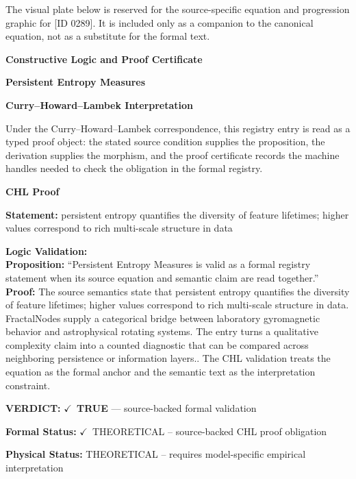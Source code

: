 \begingroup\footnotesize\sloppy
The visual plate below is reserved for the source-specific equation and progression graphic for [ID 0289]. It is included only as a companion to the canonical equation, not as a substitute for the formal text.
\par\endgroup
\ifTZPDarkEdition
{}
\fi

\clearpage
\begingroup\tzpsupportsetup
\noindent\textbf{\fontsize{10.8pt}{12.8pt}\selectfont [ID 0289] Constructive Logic and Proof Certificate}\par
\noindent\textbf{\fontsize{10pt}{12pt}\selectfont Persistent Entropy Measures}\par
\vspace{0.45em}
\begingroup
\footnotesize
\setlength{\parskip}{0.22em}
\setlength{\parindent}{0pt}
\noindent\textbf{Curry--Howard--Lambek Interpretation}\par
Under the Curry--Howard--Lambek correspondence, this registry entry is read as a typed proof
object: the stated source condition supplies the proposition, the derivation supplies the
morphism, and the proof certificate records the machine handles needed to check the obligation
in the formal registry.

\vspace{0.45em}
\noindent\textbf{CHL Proof}\par
\textbf{Statement:} persistent entropy quantifies the diversity of feature lifetimes; higher values
correspond to rich multi-scale structure in data

\textbf{Logic Validation:}\\
\textbf{Proposition:} ``Persistent Entropy Measures is valid as a formal registry statement when its source
equation and semantic claim are read together.''\\
\textbf{Proof:} The source semantics state that persistent entropy quantifies the diversity of feature
lifetimes; higher values correspond to rich multi-scale structure in data. FractalNodes
supply a categorical bridge between laboratory gyromagnetic behavior and astrophysical
rotating systems. The entry turns a qualitative complexity claim into a counted
diagnostic that can be compared across neighboring persistence or information layers..
The CHL validation treats the equation as the formal anchor and the semantic text as the
interpretation constraint.

\textbf{VERDICT:} \ensuremath{\checkmark}\ \textbf{TRUE} --- source-backed formal validation

\textbf{Formal Status:} \ensuremath{\checkmark}\ THEORETICAL -- source-backed CHL proof obligation

\textbf{Physical Status:} THEORETICAL -- requires model-specific empirical interpretation
\par\vspace{0.45em}
\par
\ifTZPDarkEdition
{}
\fi
\endgroup
\endgroup
